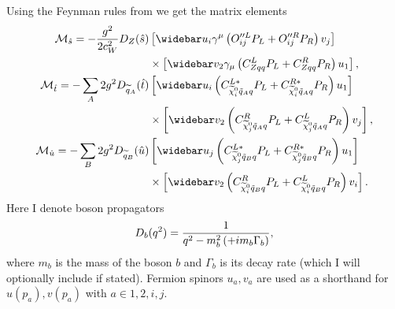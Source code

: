\documentclass[english,notitlepage]{article}
\begin{document}
    Using the Feynman rules from  we get the matrix elements
    \begin{subequations}
        \begin{align}
            \nonumber
            \M_{\hat{s}} = -\frac{g^2}{2c_W^2} D_Z(\hat{s})       & \bclosed{ \wbar{u}_i\gamma^\mu\pclosed{O^{\prime\prime L}_{ij}P_L + O^{\prime\prime R}_{ij}P_R} v_j }           \\
                                                                  & \times \bclosed{ \wbar{v}_2 \gamma_\mu \pclosed{C^L_{Zqq}P_L + C^R_{Zqq}P_R} u_1 },                             \\
            \nonumber
            \M_{\hat{t}} = -\sum_A 2g^2 D_{\wtilde{q}_A}(\hat{t}) & \bclosed{ \wbar{u}_i \pclosed{C_{\nino[i]\tilde{q}_Aq}^{L\ast}P_L + C_{\nino[i]\tilde{q}_Aq}^{R\ast} P_R} u_1 } \\
                                                                  & \times \bclosed{ \wbar{v}_2 \pclosed{C^R_{\nino[j]\tilde{q}_Aq}P_L + C^L_{\nino[j]\tilde{q}_Aq}P_R} v_j },      \\
            \nonumber
            \M_{\hat{u}} = -\sum_B 2g^2 D_{\wtilde{q}_B}(\hat{u}) & \bclosed{ \wbar{u}_j \pclosed{C_{\nino[j]\tilde{q}_Bq}^{L\ast}P_L + C_{\nino[j]\tilde{q}_Bq}^{R\ast} P_R} u_1 } \\
                                                                  & \times \bclosed{ \wbar{v}_2 \pclosed{C^R_{\nino[i]\tilde{q}_Bq}P_L + C^L_{\nino[i]\tilde{q}_Bq}P_R} v_i }.
        \end{align}
    \end{subequations}
    Here I denote boson propagators
    \[
        D_b(q^2) = \frac{1}{q^2 - m_b^2 \left(+ i m_b \Gamma_b\right)},
    \]
    where \(m_b\) is the mass of the boson \(b\) and \(\Gamma_b\) is its decay rate (which I will optionally include if stated).
    Fermion spinors \(u_a, v_a\) are used as a shorthand for \(u(p_a), v(p_a)\) with \(a \in 1, 2, i, j\).
\end{document}
